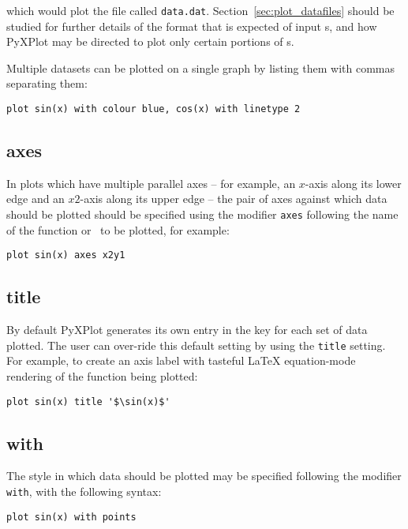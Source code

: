 \noindent which would plot the file called {\tt data.dat}.
Section~\ref{sec:plot_datafiles} should be studied for further details of the
format that is expected of input \datafile s, and how PyXPlot may be directed
to plot only certain portions of \datafile s.

Multiple datasets can be plotted on a single graph by listing them with commas
separating them:

\begin{verbatim}
plot sin(x) with colour blue, cos(x) with linetype 2
\end{verbatim}


\subsection{axes}

In plots which have multiple parallel axes -- for example, an $x$-axis along its
lower edge and an $x2$-axis along its upper edge -- the pair of axes against
which data should be plotted should be specified using the modifier {\tt axes}
following the name of the function or \datafile\ to be plotted, for example:

\begin{verbatim}
plot sin(x) axes x2y1
\end{verbatim}


\subsection{title}

By default PyXPlot generates its own entry in the key for each set of data
plotted.  The user can over-ride this default setting by using the {\tt title}
setting.  For example, to create an axis label with tasteful \LaTeX{}
equation-mode rendering of the function being plotted:

\begin{verbatim}
plot sin(x) title '$\sin(x)$'
\end{verbatim}


\subsection{with}

The style in which data should be plotted may be specified following the
modifier {\tt with}, with the following syntax:

\begin{verbatim}
plot sin(x) with points
\end{verbatim}

